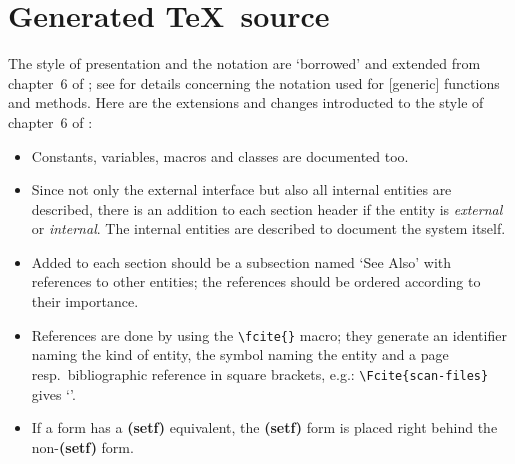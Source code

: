 \section{Generated \protect\TeX\ source}
%
The style of presentation and the notation are `borrowed' and extended
from chapter~6 of \cite{bib:amop91}; see
\cite[]{bib:amop91} for details concerning the notation
used for [generic] functions and methods.
Here are the extensions and changes introducted to the style of
chapter~6 of \cite{bib:amop91}:
\begin{itemize}
%
\item Constants, variables, macros and classes are documented too.
%
\item Since not only the external interface but also all internal
entities are described, there is an addition to each section
header if the entity is {\it external} or {\it internal}. The internal
entities are described to document the system itself.
%
\item Added to each section should be a subsection named `{\sc See
Also}' with references to other entities; the references should be
ordered according to their importance.
%
\item References are done by using the \verb|\fcite{}| macro; they
generate an identifier naming the kind of entity,
the symbol naming the entity and a page resp.\ bibliographic reference
in square brackets, e.g.: \verb|\Fcite{scan-files}| gives
`'.
%
\item If a form has a {\bf (setf)} equivalent, the {\bf(setf)} form is
placed right behind the non-{\bf(setf)} form.
%
\end{itemize}
%
